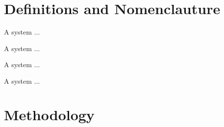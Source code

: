 \section{Definitions and Nomenclauture}

\begin{definition}[System]
    A system ...
\end{definition}

\begin{definition}[Stability]
    A system ...
\end{definition}

\begin{definition}
    A system ...
\end{definition}

\begin{definition}
    A system ...
\end{definition}

\section{Methodology}
